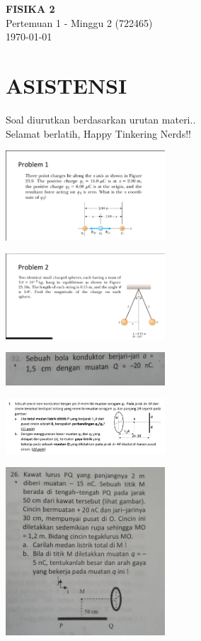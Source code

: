 \documentclass[twocolumn, 11pt]{article}%
\begin{document}
\begin{strip}
  \vspace*{\dimexpr-\stripsep}
  \begin{center}
      \Large\textbf{FISIKA 2}\\
      \large{Pertemuan 1 - Minggu 2 (722465)}\\
      \large{\today}
   \end{center}
\end{strip}

\section{ASISTENSI}
    Soal diurutkan berdasarkan urutan materi..\\
    Selamat berlatih, Happy Tinkering Nerds!!

    \begin{center}
        \includegraphics[width=225px]{1.jpg}
    \end{center}

    \begin{center}
        \includegraphics[width=225px]{2.jpg}
    \end{center}

    \begin{center}
        \includegraphics[width=225px]{3.jpg}
    \end{center}

    \begin{center}
        \includegraphics[width=225px]{4.jpg}
    \end{center}

    \begin{center}
        \includegraphics[width=225px]{5.jpg}
    \end{center}
\end{document}
